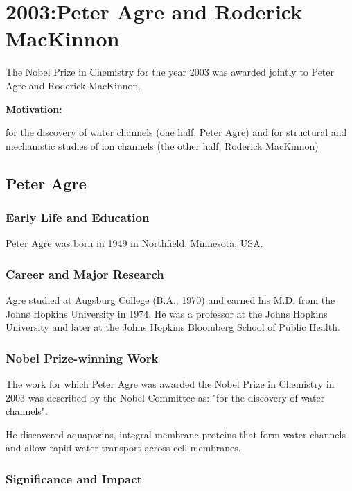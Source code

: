 \chapter{2003:Peter Agre and Roderick MacKinnon}

\label{chap:chemistry2003}

The Nobel Prize in Chemistry for the year 2003 was awarded jointly to Peter Agre and Roderick MacKinnon.

\textbf{Motivation:}

for the discovery of water channels (one half, Peter Agre) and for structural and mechanistic studies of ion channels (the other half, Roderick MacKinnon)

\section{Peter Agre}

\subsection*{Early Life and Education}

Peter Agre was born in 1949 in Northfield, Minnesota, USA.

\subsection*{Career and Major Research}

Agre studied at Augsburg College (B.A., 1970) and earned his M.D. from the Johns Hopkins University in 1974. He was a professor at the Johns Hopkins University and later at the Johns Hopkins Bloomberg School of Public Health.

\subsection*{Nobel Prize-winning Work}

The work for which Peter Agre was awarded the Nobel Prize in Chemistry in 2003 was described by the Nobel Committee as: "for the discovery of water channels".

He discovered aquaporins, integral membrane proteins that form water channels and allow rapid water transport across cell membranes.

\subsection*{Significance and Impact}

